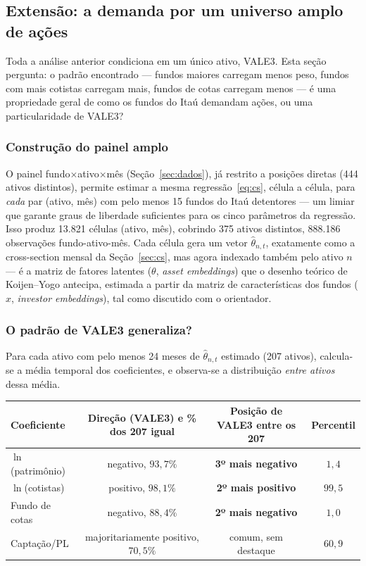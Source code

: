 \documentclass[12pt,a4paper]{article}
\begin{document}
\subsection{Extensão: a demanda por um universo amplo de ações}
\label{sec:multi}

Toda a análise anterior condiciona em um único ativo, VALE3. Esta seção pergunta: o padrão
encontrado --- fundos maiores carregam menos peso, fundos com mais cotistas carregam mais,
fundos de cotas carregam menos --- é uma propriedade geral de como os fundos do Itaú demandam
ações, ou uma particularidade de VALE3?

\subsubsection{Construção do painel amplo}

O painel fundo$\times$ativo$\times$mês (Seção~\ref{sec:dados}), já restrito a posições diretas
(444 ativos distintos), permite estimar a mesma regressão~\eqref{eq:cs}, célula a célula, para
\emph{cada} par (ativo, mês) com pelo menos 15 fundos do Itaú detentores --- um limiar que
garante graus de liberdade suficientes para os cinco parâmetros da regressão. Isso produz 13.821
células (ativo, mês), cobrindo 375 ativos distintos, 888.186 observações fundo-ativo-mês. Cada
célula gera um vetor $\widehat\theta_{n,t}$, exatamente como a cross-section mensal da
Seção~\ref{sec:cs}, mas agora indexado também pelo ativo $n$ --- é a matriz de fatores latentes
($\theta$, \emph{asset embeddings}) que o desenho teórico de Koijen--Yogo antecipa, estimada a
partir da matriz de características dos fundos ($x$, \emph{investor embeddings}), tal como
discutido com o orientador.

\subsubsection{O padrão de VALE3 generaliza?}

Para cada ativo com pelo menos 24 meses de $\widehat\theta_{n,t}$ estimado (207 ativos), calcula-se
a média temporal dos coeficientes, e observa-se a distribuição \emph{entre ativos} dessa média.

\begin{center}\scriptsize
\begin{tabular}{@{}lccc@{}}
\toprule
Coeficiente & Direção (VALE3) e \% dos 207 igual & Posição de VALE3 entre os 207 & Percentil \\
\midrule
$\ln$(patrimônio) & negativo, $93{,}7\%$ & \textbf{3º mais negativo} & $1{,}4$ \\
$\ln$(cotistas)   & positivo, $98{,}1\%$ & \textbf{2º mais positivo} & $99{,}5$ \\
Fundo de cotas     & negativo, $88{,}4\%$ & \textbf{2º mais negativo} & $1{,}0$ \\
Captação/PL       & majoritariamente positivo, $70{,}5\%$ & comum, sem destaque & $60{,}9$ \\
\bottomrule
\end{tabular}
\end{center}
\end{document}
